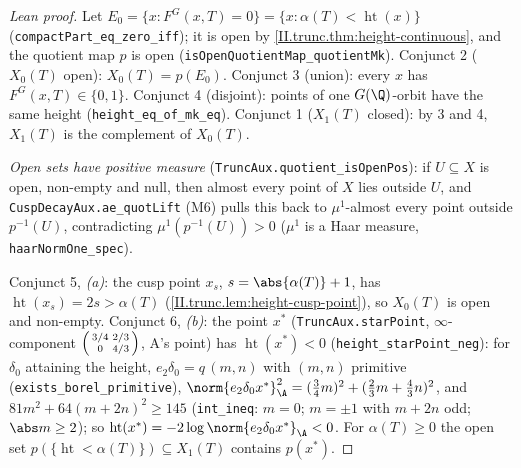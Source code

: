 \begin{proof}[Lean proof]
Let $E_0=\{x:F^G(x,T)=0\}=\{x:\alpha(T)<\operatorname{ht}(x)\}$ (\texttt{compactPart\_eq\_zero\_iff}); it is open by \cref{II.trunc.thm:height-continuous}, and the quotient map $p$ is open (\texttt{isOpenQuotientMap\_quotientMk}). Conjunct 2 ($X_0(T)$ open): $X_0(T)=p(E_0)$. Conjunct 3 (union): every $x$ has $F^G(x,T)\in\{0,1\}$. Conjunct 4 (disjoint): points of one $G(\Q)$-orbit have the same height (\texttt{height\_eq\_of\_mk\_eq}). Conjunct 1 ($X_1(T)$ closed): by 3 and 4, $X_1(T)$ is the complement of $X_0(T)$.

\emph{Open sets have positive measure} (\texttt{TruncAux.quotient\_isOpenPos}): if $U\subseteq X$ is open, non-empty and null, then almost every point of $X$ lies outside $U$, and \texttt{CuspDecayAux.ae\_quotLift} (M6) pulls this back to $\mu^1$-almost every point outside $p^{-1}(U)$, contradicting $\mu^1(p^{-1}(U))>0$ ($\mu^1$ is a Haar measure, \texttt{haarNormOne\_spec}).

Conjunct 5, \emph{(a)}: the cusp point $x_s$, $s=\abs{\alpha(T)}+1$, has $\operatorname{ht}(x_s)=2s>\alpha(T)$ (\cref{II.trunc.lem:height-cusp-point}), so $X_0(T)$ is open and non-empty. Conjunct 6, \emph{(b)}: the point $x^*$ (\texttt{TruncAux.starPoint}, $\infty$-component $\begin{psmallmatrix}3/4&2/3\\0&4/3\end{psmallmatrix}$, A's point) has $\operatorname{ht}(x^*)<0$ (\texttt{height\_starPoint\_neg}): for $\delta_0$ attaining the height, $e_2\delta_0=q\,(m,n)$ with $(m,n)$ primitive (\texttt{exists\_borel\_primitive}), $\norm{e_2\delta_0x^*}_\A^2=(\tfrac34m)^2+(\tfrac23m+\tfrac43n)^2$, and $81m^2+64(m+2n)^2\ge145$ (\texttt{int\_ineq}: $m=0$; $m=\pm1$ with $m+2n$ odd; $\abs m\ge2$); so $\operatorname{ht}(x^*)=-2\log\norm{e_2\delta_0x^*}_\A<0$. For $\alpha(T)\ge0$ the open set $p(\{\operatorname{ht}<\alpha(T)\})\subseteq X_1(T)$ contains $p(x^*)$.
\end{proof}

